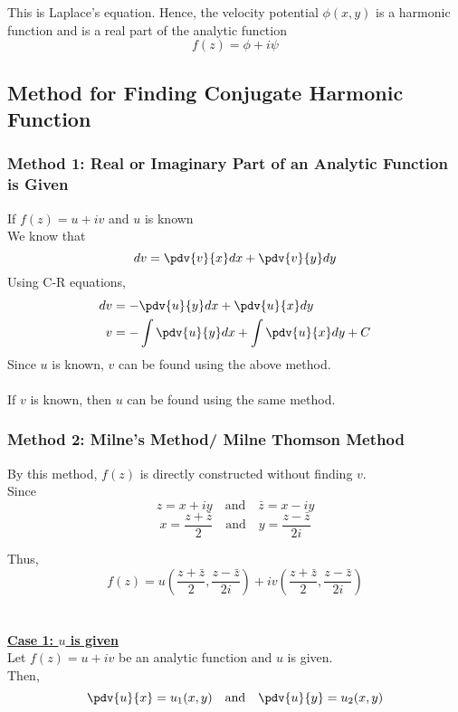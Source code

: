 This is Laplace's equation. Hence, the velocity potential $\phi(x,y)$ is a harmonic function and is a real part of the analytic function
\[
    f(z) = \phi + i\psi
\]


\subsection{Method for Finding Conjugate Harmonic Function}
\subsubsection{Method 1: Real or Imaginary Part of an Analytic Function is Given}
If $f(z) = u + iv$ and $u$ is known \\

We know that \[
    d{v} = \pdv{v}{x} d{x} + \pdv{v}{y} d{y}
\] 
Using C-R equations,
\begin{align*}
    d{v} &= -\pdv{u}{y} d{x} + \pdv{u}{x} d{y} \\
    v &= -\int \pdv{u}{y} d{x} + \int \pdv{u}{x} d{y} + C
\end{align*}
Since $u$ is known, $v$ can be found using the above method. \\~\\

If $v$ is known, then $u$ can be found using the same method.

\subsubsection{Method 2: Milne's Method/ Milne Thomson Method}
By this method, $f(z)$ is directly constructed without finding $v$. \\
Since \[
    z = x + iy \quad \text{and} \quad \bar{z} = x - iy
\] \[
    x = \frac{z + \bar{z}}{2} \quad \text{and} \quad y = \frac{z - \bar{z}}{2i}
\] 

Thus,
\begin{equation}
    \boxed{ f(z) = u\left( \frac{z + \bar{z}}{2}, \frac{z - \bar{z}}{2i} \right) + iv\left( \frac{z + \bar{z}}{2}, \frac{z - \bar{z}}{2i} \right) }
\end{equation} \\~\\

\underline{\textbf{Case 1: $u$ is given}} \\
Let $f(z) = u + iv$ be an analytic function and $u$ is given. \\
Then, \[
    \pdv{u}{x} = u_1(x,y) \quad \text{and} \quad \pdv{u}{y} = u_2(x,y)
\] 

